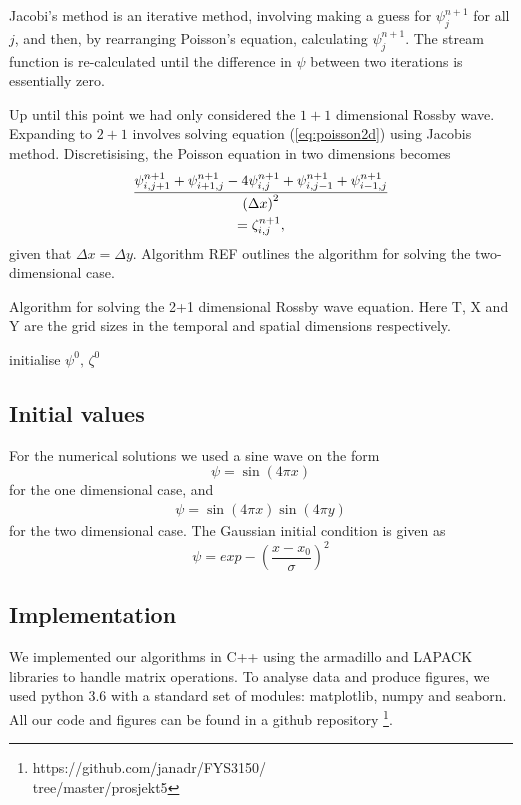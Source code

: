 Jacobi's method is an iterative method, involving making a guess for $\psi^{n+1}_j$ for all $j$, and then, by rearranging Poisson's equation, calculating $\psi_j^{n+1}$. The stream function is re-calculated until the difference in $\psi$ between two iterations is essentially zero.

Up until this point we had only considered the $1 + 1$ dimensional Rossby wave. Expanding to $2 + 1$ involves solving equation (\ref{eq:poisson2d}) using Jacobis method. Discretisising, the Poisson equation in two dimensions becomes
	\begin{multline}
	\label{eq:poissondiscret}
	\frac{\psi^{n+1}_{i,j+1} + \psi^{n+1}_{i+1,j} - 4\psi^{n+1}_{i,j} + \psi^{n+1}_{i,j-1}+ \psi^{n+1}_{i-1,j}}{\qty(\Delta x)^2} \\= \zeta^{n+1}_{i,j},
	\end{multline}
given that $\Delta x = \Delta y$. Algorithm REF outlines the algorithm for solving the two-dimensional case.

\begin{algorithm}[htbp]
	\caption{Algorithm for solving the 2+1 dimensional Rossby wave equation. Here T, X and Y are the grid sizes in the temporal and spatial dimensions respectively.}
	\SetAlgoLined
	\BlankLine
	\BlankLine
	initialise $\psi^0,\, \zeta^0$\;
	\BlankLine
	\BlankLine
	\label{algo:2drossby}
\end{algorithm}

\subsection{Initial values}
For the numerical solutions we used a sine wave on the form 
\begin{equation}
	\psi = \sin{(4\pi x)}
\end{equation}
for the one dimensional case, and 
\begin{eqnarray}
	\psi = \sin(4\pi x)\sin(4\pi y)
\end{eqnarray} 
for the two dimensional case. 
The Gaussian initial condition is given as
\begin{equation}
	\psi = exp-\left(\frac{x-x_0}{\sigma} \right)^2
\end{equation}

\subsection{Implementation}
\label{sec:implement}
We implemented our algorithms in C++ using the armadillo and LAPACK libraries to handle matrix operations. To analyse data and produce figures, we used python 3.6 with a standard set of modules: matplotlib, numpy and seaborn. All our code and figures can be found in a github repository \footnote{https://github.com/janadr/FYS3150/ \\tree/master/prosjekt5}.
